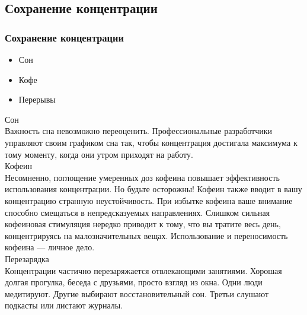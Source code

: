 \documentclass{../industrial-development}
\begin{document}
\subsection{Сохранение концентрации}
\begin{frame} \frametitle{Сохранение концентрации}
\begin{itemize}
  \item Сон
  \item Кофе
	\item Перерывы
\end{itemize}
\end{frame}
\lecturenotes
Сон\\
Важность сна невозможно переоценить. Профессиональные разработчики управляют своим графиком сна так, чтобы концентрация достигала максимума к тому моменту, когда они утром приходят на работу.\\
Кофеин\\
Несомненно, поглощение умеренных доз кофеина повышает эффективность использования  концентрации. Но будьте осторожны! Кофеин также вводит в вашу концентрацию странную неустойчивость. При избытке кофеина ваше внимание способно смещаться в непредсказуемых направлениях. Слишком сильная кофеиновая стимуляция нередко приводит к тому, что вы тратите весь день, концентрируясь на малозначительных вещах.
Использование и переносимость кофеина — личное дело.\\
Перезарядка\\
Концентрации частично перезаряжается отвлекающими занятиями. Хорошая долгая прогулка, беседа с друзьями, просто взгляд из окна. Одни люди медитируют. Другие выбирают восстановительный сон. Третьи слушают подкасты или листают журналы.
\end{document}
